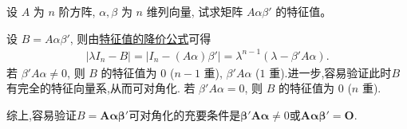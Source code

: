 \documentclass[../../main.tex]{subfiles}%
\begin{document}
\begin{example}\label{example-6.10}
设 $A$ 为 $n$ 阶方阵, $\alpha, \beta$ 为 $n$ 维列向量, 试求矩阵 $A \alpha \beta'$ 的特征值。
\end{example}
\begin{solution}
设 $B = A \alpha \beta'$, 则由\hyperref[theorem:特征值的降价公式]{特征值的降价公式}可得
\begin{align*}
| \lambda I_n - B | 
= | I_n - (A \alpha) \beta' | 
= \lambda^{n-1} (\lambda - \beta' A \alpha).
\end{align*}
若 $\beta' A \alpha \neq 0$, 则 $B$ 的特征值为 $0$ ($n-1$ 重), $\beta' A \alpha$ ($1$ 重).进一步,容易验证此时$B$有完全的特征向量系,从而可对角化.
若 $\beta' A \alpha = 0$, 则 $B$ 的特征值为 $0$ ($n$ 重).

综上,容易验证\(B=\boldsymbol{A}\boldsymbol{\alpha}\boldsymbol{\beta}'\)可对角化的充要条件是\(\boldsymbol{\beta}'\boldsymbol{A}\boldsymbol{\alpha}\neq 0\)或\(\boldsymbol{A}\boldsymbol{\alpha}\boldsymbol{\beta}' = \boldsymbol{O}\).

\end{solution}
\end{document}
